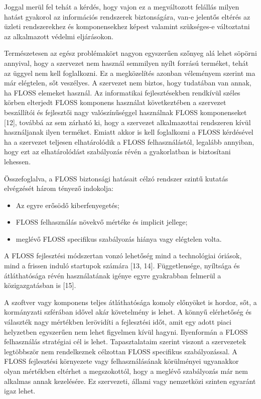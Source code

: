 \documentclass[12pt,magyar,a4paper,oneside]{scrreprt}
\providecommand{\tightlist}{%
  \setlength{\itemsep}{0pt}\setlength{\parskip}{0pt}}
\begin{document}
Joggal merül fel tehát a kérdés, hogy vajon ez a megváltozott felállás
milyen hatást gyakorol az információs rendszerek biztonságára, van-e
jelentős eltérés az üzleti rendszerekhez és komponensekhez képest
valamint szükséges-e változtatni az alkalmazott védelmi eljárásokon.

Természetesen az egész problémakört nagyon egyszerűen szőnyeg alá lehet
söpörni annyival, hogy a szervezet nem használ semmilyen nyílt forrású
terméket, tehát az üggyel nem kell foglalkozni. Ez a megközelítés
azonban véleményem szerint ma már elégtelen, sőt veszélyes. A szervezet
nem biztos, hogy tudatában van annak, ha FLOSS elemeket használ. Az
informatikai fejlesztésekben rendkívül széles körben elterjedt FLOSS
komponens használat következtében a szervezet beszállítói és fejlesztői
nagy valószínűséggel használnak FLOSS komponenseket {[}12{]}, továbbá az
sem zárható ki, hogy a szervezet alkalmazottai rendszeren kívül
használjanak ilyen terméket. Emiatt akkor is kell foglalkozni a FLOSS
kérdésével ha a szervezet teljesen elhatárolódik a FLOSS
felhasználástól, legalább annyiban, hogy ezt az elhatárolódást
szabályozás révén a gyakorlatban is biztosítani lehessen.

Összefoglalva, a FLOSS biztonsági hatásait célzó rendszer szintű kutatás
elvégzését három tényező indokolja:

\begin{itemize}
\tightlist
\item
  Az egyre erősödő kiberfenyegetés;
\item
  FLOSS felhasználás növekvő mértéke és implicit jellege;
\item
  meglévő FLOSS specifikus szabályozás hiánya vagy elégtelen volta.
\end{itemize}

A FLOSS fejlesztési módszertan vonzó lehetőség mind a technológiai
óriások, mind a frissen induló startupok számára {[}13, 14{]}.
Függetlensége, nyíltsága és átláthatósága révén használatának igénye
egyre gyakrabban felmerül a közigazgatásban is {[}15{]}.

A szoftver vagy komponens teljes átláthatósága komoly előnyöket is
hordoz, sőt, a kormányzati szférában idővel akár követelmény is lehet. A
könnyű elérhetőség és választék nagy mértékben lerövidíti a fejlesztési
időt, amit egy adott piaci helyzetben egyszerűen nem lehet figyelmen
kívül hagyni. Ilyenformán a FLOSS felhasználás stratégiai cél is lehet.
Tapasztalataim szerint viszont a szervezetek legtöbbször nem
rendelkeznek célzottan FLOSS specifikus szabályozással. A FLOSS
fejlesztési környezete vagy felhasználásának körülményei ugyanakkor
olyan mértékben eltérhet a megszokottól, hogy a meglévő szabályozás már
nem alkalmas annak kezelésére. Ez szervezeti, állami vagy nemzetközi
szinten egyaránt igaz lehet.
\end{document}
